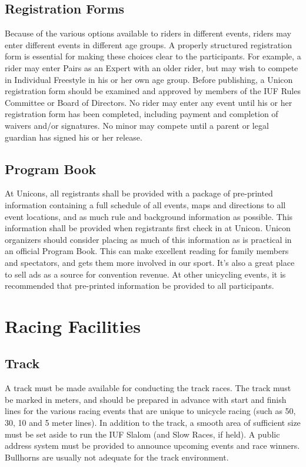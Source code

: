 \section{Registration Forms}
Because of the various options available to riders in different events, riders may enter different events in different age groups.
A properly structured registration form is essential for making these choices clear to the participants.
For example, a rider may enter Pairs as an Expert with an older rider, but may wish to compete in Individual Freestyle in his or her own age group.
Before publishing, a Unicon registration form should be examined and approved by members of the IUF Rules Committee or Board of Directors.
No rider may enter any event until his or her registration form has been completed, including payment and completion of waivers and/or signatures.
No minor may compete until a parent or legal guardian has signed his or her release.

\section{Program Book}
At Unicons, all registrants shall be provided with a package of pre-printed information containing a full schedule of all events, maps and directions to all event locations, and as much rule and background information as possible.
This information shall be provided when registrants first check in at Unicon.
Unicon organizers should consider placing as much of this information as is practical in an official Program Book.
This can make excellent reading for family members and spectators, and gets them more involved in our sport.
It's also a great place to sell ads as a source for convention revenue.
At other unicycling events, it is recommended that pre-printed information be provided to all participants.

\chapter{Racing Facilities}
\section{Track}
A track must be made available for conducting the track races.
The track must be marked in meters, and should be prepared in advance with start and finish lines for the various racing events that are unique to unicycle racing (such as 50, 30, 10 and 5 meter lines).
In addition to the track, a smooth area of sufficient size must be set aside to run the IUF Slalom (and Slow Races, if held).
A public address system must be provided to announce upcoming events and race winners.
Bullhorns are usually not adequate for the track environment.

